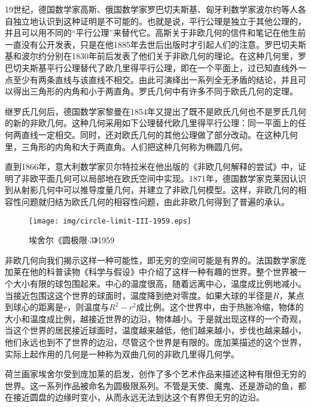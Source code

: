 \documentclass{article}
\begin{document}
19世纪，德国数学家高斯、俄国数学家罗巴切夫斯基、匈牙利数学家波尔约等人各自独立地认识到这种证明是不可能的。也就是说，平行公理是独立于其他公理的，并且可以用不同的“平行公理”来替代它。高斯关于非欧几何的信件和笔记在他生前一直没有公开发表，只是在他1885年去世后出版时才引起人们的注意。罗巴切夫斯基和波尔约分别在1830年前后发表了他们关于非欧几何的理论。在这种几何里，罗巴切夫斯基平行公理替代了欧几里得平行公理，即在一个平面上，过已知直线外一点至少有两条直线与该直线不相交。由此可演绎出一系列全无矛盾的结论，并且可以得出三角形的内角和小于两直角。罗氏几何中有许多不同于欧氏几何的定理。

继罗氏几何后，德国数学家黎曼在1854年又提出了既不是欧氏几何也不是罗氏几何的新的非欧几何。这种几何采用如下公理替代欧几里得平行公理：同一平面上的任何两直线一定相交。同时，还对欧氏几何的其他公理做了部分改动。在这种几何里，三角形的内角和大于两直角。人们把这种几何称为椭圆几何。

直到1866年，意大利数学家贝尔特拉米在他出版的《非欧几何解释的尝试》中，证明了非欧平面几何可以局部地在欧氏空间中实现。1871年，德国数学家克莱因认识到从射影几何中可以推导度量几何，并建立了非欧几何模型。这样，非欧几何的相容性问题就归结为欧氏几何的相容性问题，由此非欧几何得到了普遍的承认。

\begin{figure}[htbp]
 \centering
 \texttt{[image: img/circle-limit-III-1959.eps]}
 \captionsetup{labelformat=empty}
 \caption{埃舍尔《圆极限$\cdot$3》1959}
 \label{fig:circle-limit-3}
\end{figure}

非欧几何向我们揭示这样一种可能性，即无穷的空间可能是有界的。法国数学家庞加莱在他的科普读物《科学与假设》中介绍了这样一种有趣的世界。整个世界被一个大小有限的球包围起来。中心的温度很高，随着远离中心，温度成比例地减小。当接近包围这这个世界的球面时，温度降到绝对零度。如果大球的半径是$R$，某点到球心的距离是$r$，则温度与$R^2 - r^2$成比例。这个世界中，由于热胀冷缩，物体的大小和温度成比例，越接近世界的边沿，物体越小。于是就出现这样的一个奇观，当这个世界的居民接近球面时，温度越来越低，他们越来越小，步伐也越来越小，他们永远也到不了世界的边沿，尽管这个世界是有限的。庞加莱描述的这个世界，实际上起作用的几何是一种称为双曲几何的非欧几里得几何学。

荷兰画家埃舍尔受到庞加莱的启发，创作了多个艺术作品来描述这种有限但无穷的世界。这一系列作品被命名为圆极限系列。不管是天使、魔鬼、还是游动的鱼，都在接近圆盘的边缘时变小，从而永远无法到达这个有界但无穷的边沿。
\end{document}
